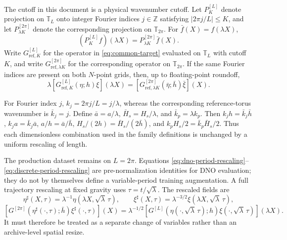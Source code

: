 \documentclass[11pt]{article}
\newcommand{\T}{\mathbb T}
\begin{document}
The cutoff in this document is a physical wavenumber cutoff.  Let
$P_K^{[L]}$ denote projection on $\T_L$ onto integer Fourier indices
$j\in\mathbb Z$ satisfying $|2\pi j/L|\leq K$, and
let $P_{\lambda K}^{[2\pi]}$ denote the corresponding projection on
$\T_{2\pi}$.  For $\bar f(X)=f(\lambda X)$,
\begin{equation}
  (P_K^{[L]}f)(\lambda X)
  =P_{\lambda K}^{[2\pi]}\bar f(X).
  \label{eq:projection-period-rescaling}
\end{equation}
Write $G_{\mathrm{ref},K}^{[L]}$ for the operator in
\eqref{eq:common-target} evaluated on $\T_L$ with cutoff $K$, and write
$G_{\mathrm{ref},\lambda K}^{[2\pi]}$ for the corresponding operator on
$\T_{2\pi}$.  If the same Fourier indices are present on both $N$-point
grids, then, up to floating-point roundoff,
\begin{equation}
  \boxed{
  \lambda
  [G_{\mathrm{ref},K}^{[L]}(\eta;h)\xi](\lambda X)
  =
  [G_{\mathrm{ref},\lambda K}^{[2\pi]}
    (\bar\eta;\bar h)\bar\xi](X).
  }
  \label{eq:discrete-period-rescaling}
\end{equation}

For Fourier index $j$, $k_j=2\pi j/L=j/\lambda$, whereas the corresponding
reference-torus wavenumber is $\bar k_j=j$.  Define
$\bar a=a/\lambda$, $\bar H_s=H_s/\lambda$, and
$\bar k_p=\lambda k_p$.  Then
$k_jh=\bar k_j\bar h$, $k_ja=\bar k_j\bar a$,
$a/h=\bar a/\bar h$, $H_s/(2h)=\bar H_s/(2\bar h)$, and
$k_pH_s/2=\bar k_p\bar H_s/2$.  Thus each dimensionless combination used in
the family definitions is unchanged by a uniform rescaling of length.

The production dataset remains on $L=2\pi$.  Equations
\eqref{eq:dno-period-rescaling}--\eqref{eq:discrete-period-rescaling} are
pre-normalization identities for DNO evaluation; they do not by themselves
define a variable-period training augmentation.  A full trajectory
rescaling at fixed gravity uses $\tau=t/\sqrt{\lambda}$.  The rescaled fields
are
\[
  \eta^\sharp(X,\tau)
    =\lambda^{-1}\eta(\lambda X,\sqrt\lambda\,\tau),\qquad
  \xi^\sharp(X,\tau)
    =\lambda^{-3/2}\xi(\lambda X,\sqrt\lambda\,\tau),
\]
\[
  [G^{[2\pi]}(\eta^\sharp(\cdot,\tau);\bar h)
       \xi^\sharp(\cdot,\tau)](X)
  =\lambda^{-1/2}
    [G^{[L]}(\eta(\cdot,\sqrt\lambda\,\tau);h)
       \xi(\cdot,\sqrt\lambda\,\tau)](\lambda X).
\]
It must therefore be treated as a separate change of variables rather than
an archive-level spatial resize.
\end{document}
